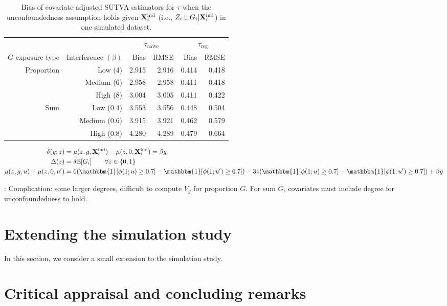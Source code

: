 \documentclass[10pt]{article}
\begin{document}
\begin{table}[ht]
\centering
\begin{tabular}{@{}rrrrrr@{}}
\toprule
& & \multicolumn{2}{c}{$\tau_\text{naive}$} & \multicolumn{2}{c}{$\tau_\text{reg}$} \\
\cmidrule(r){3-4} \cmidrule(l){5-6}
$G$ exposure type & Interference $(\beta)$ & Bias & RMSE & Bias & RMSE \\
\midrule
\multirow{3}{*}{Proportion} & Low (4) & 2.915 & 2.916 & 0.414 & 0.418 \\
& Medium (6) & 2.958 & 2.958 & 0.411 & 0.418 \\
& High (8) & 3.004 & 3.005 & 0.411 & 0.422 \\[1em]
\multirow{3}{*}{Sum} & Low (0.4) & 3.553 & 3.556 & 0.448 & 0.504 \\
& Medium (0.6) & 3.915 & 3.921 & 0.462 & 0.579 \\
& High (0.8) & 4.280 & 4.289 & 0.479 & 0.664 \\
\bottomrule
\end{tabular}
\caption{\todo Bias of covariate-adjusted SUTVA estimators for $\tau$ when the unconfoundedness assumption holds given $\mathbf{X}^{\text{ind}}_i$ (i.e., $Z_i{\perp\!\!\!\perp} G_i|\mathbf{X}^{\text{ind}}_i$) in one simulated dataset.}
\label{tab:table2}
\end{table}

\todo

\begin{align*}
\delta(g;z) &= \mu(z,g,\Xind_i) - \mu(z,0,\Xind_i) = \beta g \\
\Delta(z) &= \delta\E[G_i] \qquad \forall z\in\{0,1\} \\
\mu(z,g,u) - \mu(z,0,u') &= 6(\mathbbm{1}[\phi(1;u)\geq 0.7]-\mathbbm{1}[\phi(1;u')\geq 0.7]) - 3z(\mathbbm{1}[\phi(1;u)\geq0.7] - \mathbbm{1}[\phi(1;u')\geq0.7]) + \beta g
\end{align*}

\todo: Complication: some larger degrees, difficult to compute $V_g$ for proportion $G$. For sum $G$, covariates must include degree for unconfoundedness to hold.


\section{Extending the simulation study}

\todo In this section, we consider a small extension to the simulation study.
\\


\section{Critical appraisal and concluding remarks}
\end{document}
